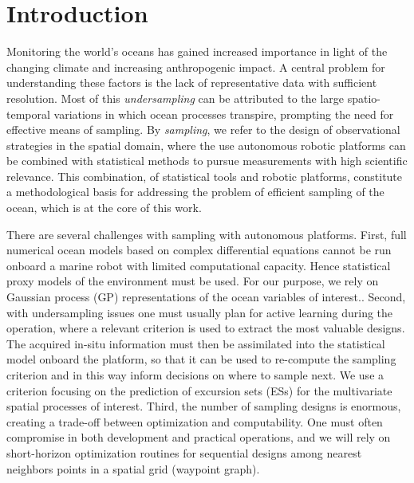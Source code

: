\documentclass[aoas]{imsart}
\begin{document}
\section{Introduction}

Monitoring the world's oceans has gained increased importance in light
of the changing climate and increasing anthropogenic impact. A central
problem for understanding these factors is the lack of representative
data with sufficient resolution. Most of this \emph{undersampling} can
be attributed to the large spatio-temporal variations in which ocean
processes transpire, prompting the need for effective means of
sampling. By \emph{sampling}, we refer to the design of observational
strategies in the spatial domain, where the use autonomous robotic
platforms can be combined with statistical methods to pursue
measurements with high scientific relevance. This combination, of
statistical tools and robotic platforms, constitute a methodological
basis for addressing the problem of efficient sampling of the ocean,
which is at the core of this work.

There are several challenges with sampling with autonomous platforms.
 First, full numerical ocean models based on complex
differential equations cannot be run onboard a marine robot with
limited computational capacity.
Hence statistical proxy models of the environment must be
used. For our purpose, we rely on Gaussian process (GP)
representations of the ocean variables of interest.. Second, with
undersampling issues  one must usually plan for
active learning during the operation, where a relevant criterion is
used to extract the most valuable designs. The acquired in-situ
information must then be assimilated into the statistical model
onboard the platform, so that it can be used to re-compute the
sampling criterion and in this way inform decisions on where to sample
next. We use a criterion focusing on the prediction of excursion sets
(ESs) for the multivariate spatial processes of interest. Third, the
number of sampling designs is enormous, creating a trade-off between
optimization and computability. One must often compromise in both
development and practical operations, and we will rely on
short-horizon optimization routines for sequential designs among
nearest neighbors points in a spatial grid (waypoint graph).
\end{document}
